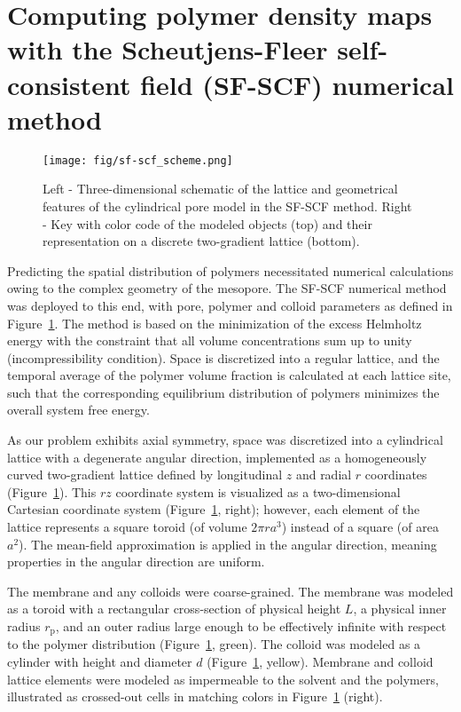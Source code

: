 \documentclass[10pt, a4paper]{article}
\begin{document}
\section{Computing polymer density maps with the Scheutjens-Fleer self-consistent field (SF-SCF) numerical method}
\begin{multicols}{2}

\begin{figure}[H]
    \centering
    \texttt{[image: fig/sf-scf\_scheme.png]}
    \caption{
    Left - Three-dimensional schematic of the lattice and geometrical features of the cylindrical pore model in the SF-SCF method.
    Right - Key with color code of the modeled objects (top) and their representation on a discrete two-gradient lattice (bottom).
    }
    \label{fig:sf-scf_scheme}
\end{figure}


Predicting the spatial distribution of polymers necessitated numerical calculations owing to the complex geometry of the mesopore. 
The SF-SCF numerical method was deployed to this end, with pore, polymer and colloid parameters as defined in Figure~\ref{fig:sf-scf_scheme}.
The method is based on the minimization of the excess Helmholtz energy with the constraint that all volume concentrations sum up to unity (incompressibility condition).
Space is discretized into a regular lattice, and the temporal average of the polymer volume fraction is calculated at each lattice site, such that the corresponding equilibrium distribution of polymers minimizes the overall system free energy.

As our problem exhibits axial symmetry, space was discretized into a cylindrical lattice with a degenerate angular direction,
implemented as a homogeneously curved two-gradient lattice defined by longitudinal $z$ and radial $r$ coordinates (Figure~\ref{fig:sf-scf_scheme}).
This $rz$ coordinate system is visualized as a two-dimensional Cartesian coordinate system (Figure~\ref{fig:sf-scf_scheme}, right); however, each element of the lattice represents a square toroid (of volume $2 \pi r a^3$) instead of a square (of area $a^2$).
The mean-field approximation is applied in the angular direction, meaning properties in the angular direction are uniform.

The membrane and any colloids were coarse-grained.
The membrane was modeled as a toroid with a rectangular cross-section of physical height $L$, a physical inner radius $r_{\text{p}}$, and an outer radius large enough to be effectively infinite with respect to the polymer distribution (Figure~\ref{fig:sf-scf_scheme}, green).
The colloid was modeled as a cylinder with height and diameter $d$ (Figure~\ref{fig:sf-scf_scheme}, yellow).
Membrane and colloid lattice elements were modeled as impermeable to the solvent and the polymers, illustrated as crossed-out cells in matching colors in Figure~\ref{fig:sf-scf_scheme} (right).


\end{multicols}
\end{document}
